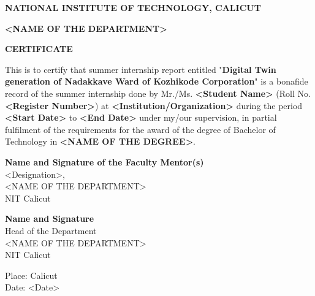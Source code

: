 \begin{center}
    {\Large \textbf{NATIONAL INSTITUTE OF TECHNOLOGY, CALICUT}}\par
    {\Large \textbf{<NAME OF THE DEPARTMENT>}}\par
    \vspace{1cm}
    \vspace{1cm}
    {\Large \textbf{CERTIFICATE}}\par
\end{center}

\vspace{1cm}
\noindent This is to certify that summer internship report entitled "\textbf{Digital Twin generation of Nadakkave Ward of Kozhikode Corporation}" is a bonafide record of the summer internship done by Mr./Ms. \textbf{<Student Name>} (Roll No. \textbf{<Register Number>}) at \textbf{<Institution/Organization>} during the period \textbf{<Start Date>} to \textbf{<End Date>} under my/our supervision, in partial fulfilment of the requirements for the award of the degree of Bachelor of Technology in \textbf{<NAME OF THE DEGREE>}.

\vspace{3cm}

\noindent
\begin{minipage}[t]{0.5\textwidth}
\begin{flushleft}
\textbf{Name and Signature of the Faculty Mentor(s)}\\
<Designation>,\\
<NAME OF THE DEPARTMENT>\\
NIT Calicut
\end{flushleft}
\end{minipage}%
\begin{minipage}[t]{0.5\textwidth}
\begin{flushright}
\textbf{Name and Signature}\\
Head of the Department\\
<NAME OF THE DEPARTMENT>\\
NIT Calicut
\end{flushright}
\end{minipage}

\vspace{2cm}
\noindent Place: Calicut\\
Date: <Date>
\newpage
